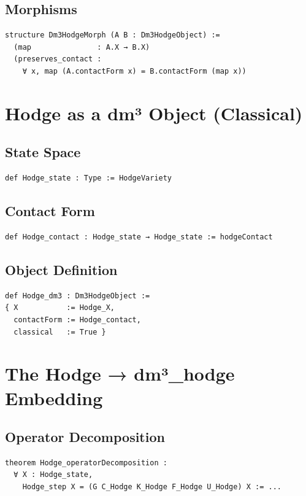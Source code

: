 \documentclass[11pt,a4paper]{article}
\begin{document}
\subsection{Morphisms}
\begin{lstlisting}
structure Dm3HodgeMorph (A B : Dm3HodgeObject) :=
  (map               : A.X → B.X)
  (preserves_contact :
    ∀ x, map (A.contactForm x) = B.contactForm (map x))
\end{lstlisting}

\section{Hodge as a dm³ Object (Classical)}

\subsection{State Space}
\begin{lstlisting}
def Hodge_state : Type := HodgeVariety
\end{lstlisting}

\subsection{Contact Form}
\begin{lstlisting}
def Hodge_contact : Hodge_state → Hodge_state := hodgeContact
\end{lstlisting}

\subsection{Object Definition}
\begin{lstlisting}
def Hodge_dm3 : Dm3HodgeObject :=
{ X           := Hodge_X,
  contactForm := Hodge_contact,
  classical   := True }
\end{lstlisting}

\section{The Hodge → dm³\_hodge Embedding}

\subsection{Operator Decomposition}
\begin{lstlisting}
theorem Hodge_operatorDecomposition :
  ∀ X : Hodge_state,
    Hodge_step X = (G C_Hodge K_Hodge F_Hodge U_Hodge) X := ...
\end{lstlisting}
\end{document}
